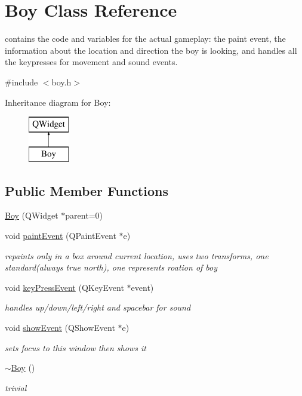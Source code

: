 \hypertarget{class_boy}{}\section{Boy Class Reference}
\label{class_boy}


contains the code and variables for the actual gameplay\+: the paint event, the information about the location and direction the boy is looking, and handles all the keypresses for movement and sound events.  




{\ttfamily \#include $<$boy.\+h$>$}

Inheritance diagram for Boy\+:\begin{figure}[H]
\begin{center}
\leavevmode
\includegraphics[height=2.000000cm]{class_boy}
\end{center}
\end{figure}
\subsection*{Public Member Functions}
\begin{DoxyCompactItemize}
\item 
\hyperlink{class_boy_a20d67f8ae1c138d99262d06b20a27828}{Boy} (Q\+Widget $\ast$parent=0)
\item 
void \hyperlink{class_boy_acc337820c2005a5b1bda27c79ce132ce}{paint\+Event} (Q\+Paint\+Event $\ast$e)
\begin{DoxyCompactList}\small\item\em repaints only in a box around current location, uses two transforms, one standard(always true north), one represents roation of boy \end{DoxyCompactList}\item 
void \hyperlink{class_boy_ad4c4ab4cef05d3de77cf0a722f057cec}{key\+Press\+Event} (Q\+Key\+Event $\ast$event)
\begin{DoxyCompactList}\small\item\em handles up/down/left/right and spacebar for sound \end{DoxyCompactList}\item 
void \hyperlink{class_boy_a5ae87dac77e081764ad47d97b45ad8cf}{show\+Event} (Q\+Show\+Event $\ast$e)
\begin{DoxyCompactList}\small\item\em sets focus to this window then shows it \end{DoxyCompactList}\item 
\hyperlink{class_boy_a3e726dc39e116ca63dbb3fff61ab2dea}{$\sim$\+Boy} ()
\begin{DoxyCompactList}\small\item\em trivial \end{DoxyCompactList}\end{DoxyCompactItemize}



